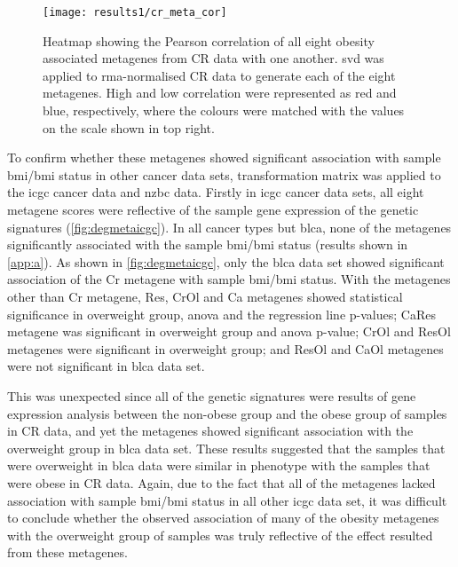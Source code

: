 \begin{figure}[htpb]
	\centering
	\texttt{[image: results1/cr\_meta\_cor]}
	\caption[Pearson correlation of all eight obesity associated metagenes identified in CR data]{Heatmap showing the Pearson correlation of all eight obesity associated metagenes from CR data with one another.
	\gls{svd} was applied to \gls{rma}-normalised CR data to generate each of the eight metagenes.
	High and low correlation were represented as red and blue, respectively, where the colours were matched with the values on the scale shown in top right.}
	\label{fig:cr_meta_cor}
\end{figure}

To confirm whether these metagenes showed significant association with sample \gls{bmi}/\gls{bmi} status in other cancer data sets, transformation matrix was applied to the \gls{icgc} cancer data and \gls{nzbc} data.
Firstly in \gls{icgc} cancer data sets, all eight metagene scores were reflective of the sample gene expression of the genetic signatures (\cref{fig:degmetaicgc}).
In all cancer types but \gls{blca}, none of the metagenes significantly associated with the sample \gls{bmi}/\gls{bmi} status (results shown in \cref{app:a}).
As shown in \cref{fig:degmetaicgc}, only the \gls{blca} data set showed significant association of the Cr metagene with sample \gls{bmi}/\gls{bmi} status.
With the metagenes other than Cr metagene, Res, CrOl and Ca metagenes showed statistical significance in overweight group, \gls{anova} and the regression line p-values; CaRes metagene was significant in overweight group and \gls{anova} p-value; CrOl and ResOl metagenes were significant in overweight group; and ResOl and CaOl metagenes were not significant in \gls{blca} data set.

This was unexpected since all of the genetic signatures were results of gene expression analysis between the non-obese group and the obese group of samples in CR data, and yet the metagenes showed significant association with the overweight group in \gls{blca} data set.
These results suggested that the samples that were overweight in \gls{blca} data were similar in phenotype with the samples that were obese in CR data.
Again, due to the fact that all of the metagenes lacked association with sample \gls{bmi}/\gls{bmi} status in all other \gls{icgc} data set, it was difficult to conclude whether the observed association of many of the obesity metagenes with the overweight group of samples was truly reflective of the effect resulted from these metagenes.

